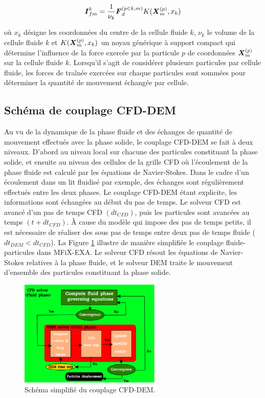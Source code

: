 \begin{equation} \label{fm_momentum}
\boldsymbol{I}_{fm}^k = \frac{1}{\nu_k}\boldsymbol{F}_d^{(p \in k,m)}K(\boldsymbol{X}_m^{(p)},x_k)
\end{equation}

\noindent où $x_k$ désigne les coordonnées du centre de la cellule fluide $k$, $\nu_k$ le volume de la cellule fluide $k$ et $K(\boldsymbol{X}_m^{(p)},x_k)$ un noyau générique à support compact qui détermine l'influence de la force exercée par la particule $p$ de coordonnées $\boldsymbol{X}_m^{(p)}$ sur la cellule fluide $k$. Lorsqu'il s'agit de considérer plusieurs particules par cellule fluide, les forces de traînée exercées sur chaque particules sont sommées pour déterminer la quantité de mouvement échangée par cellule.

\subsection*{Schéma de couplage CFD-DEM}

Au vu de la dynamique de la phase fluide et des échanges de quantité de mouvement effectués avec la phase solide, le couplage CFD-DEM se fait à deux niveaux. D'abord au niveau local sur chacune des particules constituant la phase solide, et ensuite au niveau des cellules de la grille CFD où l'écoulement de la phase fluide est calculé par les équations de Navier-Stokes. Dans le cadre d'un écoulement dans un lit fluidisé par exemple, des échanges sont régulièrement effectués entre les deux phases. Le couplage CFD-DEM étant explicite, les informations sont échangées au début du pas de temps. Le solveur CFD est avancé d'un pas de temps CFD $(dt_{CFD})$, puis les particules sont avancées au temps $(t+dt_{CFD})$. À cause du modèle qui impose des pas de temps petits, il est nécessaire de réaliser des sous pas de temps entre deux pas de temps fluide ($dt_{DEM}<dt_{CFD}$). La Figure \ref{schema_couplage} illustre de manière simplifiée le couplage fluide-particules dans MFiX-EXA. Le solveur CFD résout les équations de Navier-Stokes relatives à la phase fluide, et le solveur DEM traite le mouvement d'ensemble des particules constituant la phase solide.

\begin{figure}[!h]
  \centering
    \includegraphics[width=0.6\textwidth]{chapitres/chapitre_4/figures/shema_couplage.png}
    \caption{\centering Schéma simplifié du couplage CFD-DEM.}\label{schema_couplage}
\end{figure}

